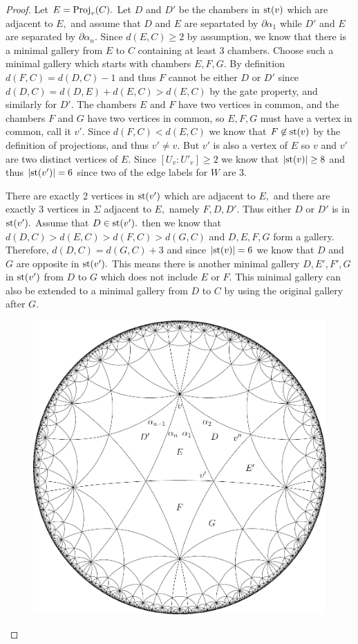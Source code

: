 \documentclass[class=book, crop=false]{standalone}
\begin{document}
\begin{proof}
	Let $E=\mathrm{Proj}_v(C).$ Let $D$ and $D'$ be the chambers in $\mathrm{st}(v)$ which are adjacent to $E,$ and assume that $D$ and $E$ are separtated by $\partial\alpha_1$ while $D'$ and $E$ are separated by $\partial\alpha_n.$ Since $d(E,C)\ge 2$ by assumption, we know that there is a minimal gallery from $E$ to $C$ containing at least 3 chambers. Choose such a minimal gallery which starts with chambers $E,F,G.$ By definition $d(F,C)=d(D,C)-1$ and thus $F$ cannot be either $D$ or $D'$ since $d(D,C)=d(D,E)+d(E,C)>d(E,C)$ by the gate property, and similarly for $D'.$ The chambers $E$ and $F$ have two vertices in common, and the chambers $F$ and $G$ have two vertices in common, so $E,F,G$ must have a vertex in common, call it $v'.$ Since $d(F,C)<d(E,C)$ we know that $F\not\in \mathrm{st}(v)$ by the definition of projections, and thus $v'\neq v.$ But $v'$ is also a vertex of $E$ so $v$ and $v'$ are two distinct vertices of $E.$ Since $[U_v:U'_v]\ge 2$ we know that $|\mathrm{st}(v)|\ge 8$ and thus $|\mathrm{st}(v')|=6$ since two of the edge labels for $W$ are 3.

	There are exactly 2 vertices in $\mathrm{st}(v')$ which are adjacent to $E,$ and there are exactly 3 vertices in $\Sigma$ adjacent to $E,$ namely $F,D,D'.$ Thus either $D$ or $D'$ is in $\mathrm{st}(v').$ Assume that $D\in \mathrm{st}(v').$ then we know that $d(D,C)>d(E,C)>d(F,C)>d(G,C)$ and $D,E,F,G$ form a gallery. Therefore, $d(D,C)=d(G,C)+3$ and since $|\mathrm{st}(v)|=6$ we know that $D$ and $G$ are opposite in $\mathrm{st}(v').$ This means there is another minimal gallery $D,E',F',G$ in $\mathrm{st}(v')$ from $D$ to $G$ which does not include $E$ or $F.$ This minimal gallery can also be extended to a minimal gallery from $D$ to $C$ by using the original gallery after $G.$

\begin{figure}[h]
	\label{fig:33n}
	\begin{center}
		\includegraphics[width=4.5 in]{diagrams/deg33n.pdf}
\end{center}
\end{figure}



\end{proof}
\end{document}

